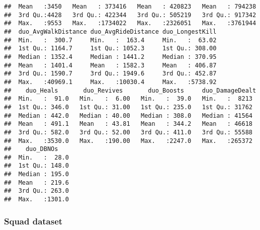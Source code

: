\documentclass[]{article}
\begin{document}
\begin{verbatim}
##  Mean   :3450   Mean   : 373416   Mean   : 420823   Mean   : 794238  
##  3rd Qu.:4428   3rd Qu.: 422344   3rd Qu.: 505219   3rd Qu.: 917342  
##  Max.   :9553   Max.   :1734022   Max.   :2326051   Max.   :3761944  
##  duo_AvgWalkDistance duo_AvgRideDistance duo_LongestKill  
##  Min.   :  300.7     Min.   :  163.4     Min.   :  63.02  
##  1st Qu.: 1164.7     1st Qu.: 1052.3     1st Qu.: 308.00  
##  Median : 1352.4     Median : 1441.2     Median : 370.95  
##  Mean   : 1401.4     Mean   : 1582.3     Mean   : 406.87  
##  3rd Qu.: 1590.7     3rd Qu.: 1949.6     3rd Qu.: 452.87  
##  Max.   :40969.1     Max.   :10030.4     Max.   :5738.92  
##    duo_Heals       duo_Revives       duo_Boosts     duo_DamageDealt 
##  Min.   :  91.0   Min.   :  6.00   Min.   :  39.0   Min.   :  8213  
##  1st Qu.: 346.0   1st Qu.: 31.00   1st Qu.: 235.0   1st Qu.: 31762  
##  Median : 442.0   Median : 40.00   Median : 308.0   Median : 41564  
##  Mean   : 491.1   Mean   : 43.81   Mean   : 344.2   Mean   : 46618  
##  3rd Qu.: 582.0   3rd Qu.: 52.00   3rd Qu.: 411.0   3rd Qu.: 55588  
##  Max.   :3530.0   Max.   :190.00   Max.   :2247.0   Max.   :265372  
##    duo_DBNOs     
##  Min.   :  28.0  
##  1st Qu.: 148.0  
##  Median : 195.0  
##  Mean   : 219.6  
##  3rd Qu.: 263.0  
##  Max.   :1301.0
\end{verbatim}

\subsubsection{Squad dataset}\label{squad-dataset}
\end{document}
